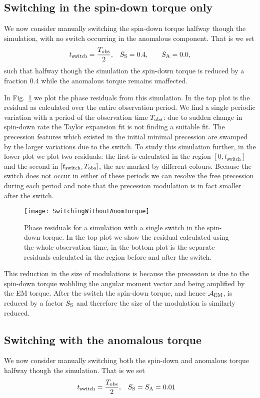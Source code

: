 \documentclass[../full_thesis/full_thesis.tex]{subfiles}
\begin{document}
\subsection{Switching in the spin-down torque only}
We now consider manually switching the spin-down torque halfway though the
simulation, with no switch occurring in the anomalous component.
That is we set
\begin{align}
    t_{\mathrm{switch}} = \frac{T_{\textrm{obs}}}{2}, &&& S_{\mathrm{S}} = 0.4, &&& S_{\mathrm{A}} = 0.0,
\end{align}
such that halfway though the simulation the spin-down torque is reduced by a
fraction $0.4$ while the anomalous torque remains unaffected.

In Fig.~\ref{fig: switching without anom} we plot the phase residuals from
this simulation. In the top plot is the residual as calculated over the entire
observation period. We find a single periodic variation with a period of the
observation time $T_{\textrm{obs}}$: due to sudden change in spin-down rate the Taylor
expansion fit is not finding a suitable fit. The precession features which existed
in the initial minimal precession are swamped by the larger variations due to
the switch. To study this simulation further,
in the lower plot we plot two residuals: the first is calculated
in the region $[0, t_{\mathrm{switch}}]$ and the second in $[t_{\mathrm{switch}}, T_{\textrm{obs}}]$,
the are marked by different colours.
Because the switch does not occur in either of these periods we can resolve the
free precession during each period and note that the precession modulation is
in fact smaller after the switch.
\begin{figure}[htb]
\texttt{[image: SwitchingWithoutAnomTorque]}
\caption{Phase residuals for a simulation with a single switch in the spin-down
torque. In the top plot we show the residual calculated using the whole observation
time, in the bottom plot is the separate residuals calculated in the region before
and after the switch.}
\label{fig: switching without anom}
\end{figure}
This reduction in the size of modulations is because the precession is due to
the spin-down torque wobbling the angular moment vector and being amplified by
the EM torque. After the switch the spin-down torque, and hence $\mathcal{A}_{\mathrm{EM}}$, is
reduced by a factor $S_{\mathrm{S}}$ and therefore the size of the modulation is similarly
reduced.

\subsection{Switching with the anomalous torque}
We now consider manually switching both the spin-down and anomalous torque
halfway though the simulation.  That is we set
\begin{align}
    t_{\mathrm{switch}} = \frac{T_{\textrm{obs}}}{2}, &&& S_{\mathrm{S}} = S_{\mathrm{A}} = 0.01
\end{align}
\end{document}

